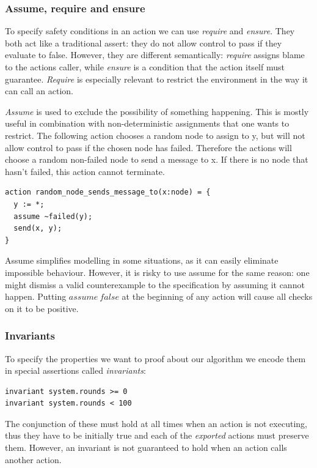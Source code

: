 \documentclass[fleqn]{article}
\begin{document}
\subsubsection{Assume, require and ensure}
To specify safety conditions in an action we can use \textit{require} and \textit{ensure}.
They both act like a traditional assert: they do not allow control to pass if they evaluate to false.
However, they are different semantically: \textit{require} assigns blame to the actions caller, while \textit{ensure}
is a condition that the action itself must guarantee. \textit{Require} is especially relevant to restrict
the environment in the way it can call an action.

\textit{Assume} is used to exclude the possibility of something happening.  This is mostly useful in combination with non-deterministic assignments that one wants to restrict. The following action chooses a random node to assign to y, but will not allow control to pass if the chosen node has failed. Therefore the actions will choose a random non-failed node to send a message to x.  If there is no node that hasn't failed, this action cannot terminate.

\begin{mdframed}[backgroundcolor=light-gray, roundcorner=10pt,leftmargin=1, rightmargin=1, innerleftmargin=15, innertopmargin=15,innerbottommargin=15, outerlinewidth=1, linecolor=light-gray]
\begin{lstlisting}
action random_node_sends_message_to(x:node) = {
  y := *;
  assume ~failed(y);
  send(x, y);
}
\end{lstlisting}
\end{mdframed}

Assume simplifies modelling in some situations, as it can easily eliminate impossible behaviour. However,
it is risky to use assume for the same reason: one might dismiss a valid counterexample to the specification
by assuming it cannot happen. Putting $assume\ false$ at the beginning of any action will cause all checks on it
to be positive.


\subsubsection{Invariants}
To specify the properties we want to proof about our algorithm we encode them in special assertions called \textit{invariants}:

\begin{mdframed}[backgroundcolor=light-gray, roundcorner=10pt,leftmargin=1, rightmargin=1, innerleftmargin=15, innertopmargin=15,innerbottommargin=15, outerlinewidth=1, linecolor=light-gray]
\begin{lstlisting}
invariant system.rounds >= 0
invariant system.rounds < 100
\end{lstlisting}
\end{mdframed}
The conjunction of these must hold at all times when an action is not executing, thus they have to be initially true and each of
the \textit{exported} actions must preserve them. However, an invariant is not guaranteed to hold when an action calls another action.
\end{document}
